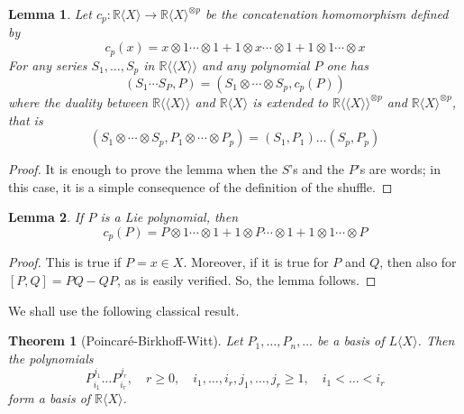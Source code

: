 \documentclass[a4paper,12pt]{article}
\newtheorem*{theorem*}{Theorem}
\newtheorem{lemma}{Lemma}
\newcommand{\R}{\mathbb{R}}
\newcommand{\Rx}{\R\langle X\rangle}
\newcommand{\Lx}{L\langle X\rangle}
\newcommand{\Rxx}{\R\langle\langle X\rangle\rangle}
\begin{document}

\begin{lemma} \label{l:1}
	Let $c_p: \Rx \to \Rx^{\otimes p}$ be the concatenation homomorphism defined by
	\begin{equation*}
		c_p(x)= x \otimes 1 \dotsb \otimes 1 + 1 \otimes x \dotsb \otimes 1 + 1 \otimes 1 \dotsb \otimes x
	\end{equation*}
	For any series $S_1, \ldots, S_p$ in $\Rxx$ and any polynomial $P$ one has
	\begin{equation*}
		\left({S}_1 \dotsb {S}_{{P}}, {P}\right)=\left({S}_1 \otimes \dotsb \otimes {S}_{{p}}, {c}_{{p}}({P})\right)
	\end{equation*}
	where the duality between $\Rxx$ and $\Rx$ is extended to $\Rxx^{\otimes p}$ and $\Rx^{\otimes p}$, that is
	\begin{equation*}
		\left(S_1 \otimes \dotsb \otimes S_p, {P}_1 \otimes \dotsb \otimes {P}_{{p}}\right)=\left(S_1, {P}_1\right) \ldots\left(S_p, P_p\right)
	\end{equation*}
\end{lemma}

\begin{proof}
	It is enough to prove the lemma when the $S$'s and the $P$'s are words; in this case, it is a simple consequence of the definition of the shuffle.
\end{proof}


\begin{lemma} \label{l:2}
	If $P$ is a Lie polynomial, then
	\begin{equation*}
		c_p(P) = P \otimes 1 \dotsb \otimes 1 + 1 \otimes P \dotsb \otimes 1 + 1 \otimes 1 \dotsb \otimes P
	\end{equation*}
\end{lemma}

\begin{proof}
	This is true if $P=x \in X$. Moreover, if it is true for $P$ and $Q$, then also for $[P, Q]=P Q-Q P$, as is easily verified. So, the lemma follows.
\end{proof}


We shall use the following classical result.

\begin{theorem*}[Poincaré-Birkhoff-Witt]
	Let $P_1, \ldots, P_n, \ldots$ be a basis of $\Lx$. Then the polynomials
	\begin{equation*}
		P_{i_1}^{j_1} \ldots P_{i_r}^{j_r}, 
		\quad r \geq 0, \quad i_1, \ldots, i_r, j_1, \ldots, j_r \geq 1, 
		\quad i_1<\ldots < i_r
	\end{equation*}
	form a basis of $\Rx$.
\end{theorem*}
\end{document}
